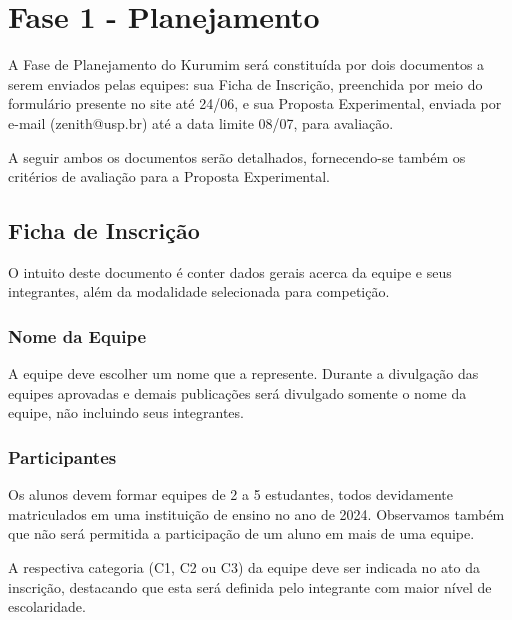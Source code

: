 \section{Fase 1 - Planejamento}
    A Fase de Planejamento do Kurumim será constituída por dois documentos a serem enviados pelas equipes: sua Ficha de Inscrição, preenchida por meio do formulário presente no site até 24/06, e sua Proposta Experimental, enviada por e-mail (zenith@usp.br) até a data limite 08/07, para avaliação.

    A seguir ambos os documentos serão detalhados, fornecendo-se também os critérios de avaliação para a Proposta Experimental.

    \subsection{Ficha de Inscrição}
        O intuito deste documento é conter dados gerais acerca da equipe e seus integrantes, além da modalidade selecionada para competição.
    
        \subsubsection{Nome da Equipe}
            A equipe deve escolher um nome que a represente. Durante a divulgação das equipes aprovadas e demais publicações será divulgado somente o nome da equipe, não incluindo seus integrantes.
            
        \subsubsection{Participantes}
            Os alunos devem formar equipes de 2 a 5 estudantes, todos devidamente matriculados em uma instituição de ensino no ano de 2024. Observamos também que não será permitida a participação de um aluno em mais de uma equipe.

            A respectiva categoria (C1, C2 ou C3) da equipe deve ser indicada no ato da inscrição, destacando que esta será definida pelo integrante com maior nível de escolaridade. 
                
    
